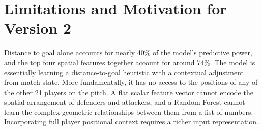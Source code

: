 \section{Limitations and Motivation for Version 2}

Distance to goal alone accounts for nearly 40\% of the model's predictive power, and the top four spatial features together account for around 74\%. The model is essentially learning a distance-to-goal heuristic with a contextual adjustment from match state. More fundamentally, it has no access to the positions of any of the other 21 players on the pitch. A flat scalar feature vector cannot encode the spatial arrangement of defenders and attackers, and a Random Forest cannot learn the complex geometric relationships between them from a list of numbers. Incorporating full player positional context requires a richer input representation.
